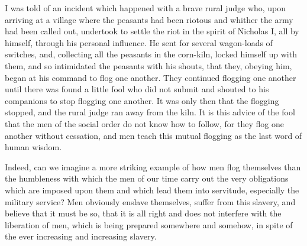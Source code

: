 \documentclass{book}
\begin{document}
I was told of an incident which happened with a brave rural judge who, upon arriving at a village where the peasants had been riotous and whither the army had been called out, undertook to settle the riot in the spirit of Nicholas I, all by himself, through his personal influence. He sent for several wagon-loads of switches, and, collecting all the peasants in the corn-kiln, locked himself up with them, and so intimidated the peasants with his shouts, that they, obeying him, began at his command to flog one another. They continued flogging one another until there was found a little fool who did not submit and shouted to his companions to stop flogging one another. It was only then that the flogging stopped, and the rural judge ran away from the kiln. It is this advice of the fool that the men of the social order do not know how to follow, for they flog one another without cessation, and men teach this mutual flogging as the last word of human wisdom.

Indeed, can we imagine a more striking example of how men flog themselves than the humbleness with which the men of our time carry out the very obligations which are imposed upon them and which lead them into servitude, especially the military service? Men obviously enslave themselves, suffer from this slavery, and believe that it must be so, that it is all right and does not interfere with the liberation of men, which is being prepared somewhere and somehow, in spite of the ever increasing and increasing slavery.
\end{document}
